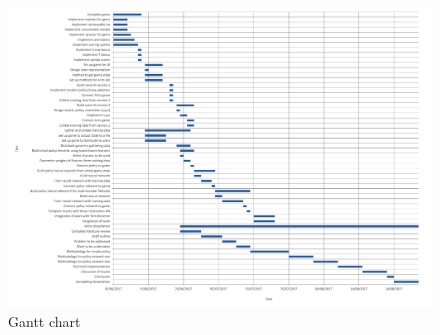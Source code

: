 \documentclass{bhamthesis}
\theoremstyle{definition}
\begin{document}
\begin{figure}
\begin{center}
\includegraphics[scale=0.525,origin=c,angle=90]{media/img/GanttChart.pdf} 
\caption{Gantt chart}
\end{center}
\end{figure}
\end{document}

